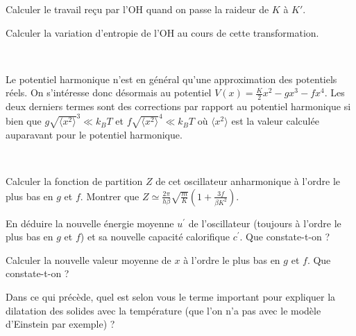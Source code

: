 \question Calculer le travail reçu par l'OH quand on passe la raideur de $K$ à $K'$.

\question Calculer la variation d'entropie de l'OH au cours de cette transformation.

\

Le potentiel harmonique n'est en général qu'une approximation des potentiels réels. On s'intéresse donc désormais au potentiel $V(x)=\frac{K}{2}x^2-g x^3-f x^4$. Les deux derniers termes sont des corrections par rapport au potentiel harmonique si bien que $g\sqrt{\langle x^2 \rangle}^3 \ll k_B T$ et $f\sqrt{\langle x^2 \rangle}^4 \ll k_B T$ où $\langle x^2 \rangle$ est la valeur calculée auparavant pour le potentiel harmonique. 

\

\question Calculer la fonction de partition $Z$ de cet oscillateur anharmonique à l'ordre le plus bas en $g$ et $f$. Montrer que $Z \simeq \frac{2\pi}{h \beta} \sqrt{\frac{m}{K}} \left( 1+\frac{3f}{\beta K^2} \right)$.

\question En déduire la nouvelle énergie moyenne $u^{\prime}$ de l'oscillateur (toujours à l'ordre le plus bas en $g$ et $f$) et sa nouvelle capacité calorifique $c^{\prime}$. Que constate-t-on ?

\question Calculer la nouvelle valeur moyenne de $x$ à l'ordre le plus bas en $g$ et $f$. Que constate-t-on ?

\question Dans ce qui précède, quel est selon vous le terme important pour expliquer la dilatation des solides avec la température (que l'on n'a pas avec le modèle d'Einstein par exemple) ?


